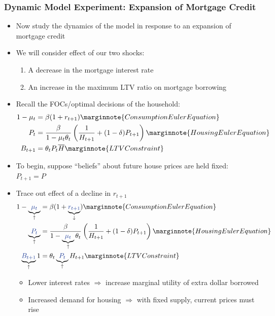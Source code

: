 \documentclass[a4paper]{article}
\begin{document}
\subsubsection{Dynamic Model Experiment: Expansion of Mortgage Credit}
	\begin{itemize}
		\item Now study the \textcolor{myblue}{dynamics} of the model in response to an expansion of mortgage credit
		\item We will consider effect of our two shocks:
		\begin{enumerate}[label=\textbf{\arabic*.}]
			\item A decrease in the mortgage interest rate
			\item An increase in the maximum LTV ratio on mortgage borrowing
		\end{enumerate}
		\item Recall the FOCs/optimal decisions of the household:
		\begin{align*}
			1-\mu_t&=\beta(1+r_{t+1}) \marginnote{Consumption Euler Equation}\\
			P_t&=\frac{\beta}{1-\mu_t\theta_t}\left( \frac{1}{H_{t+1}} + (1-\delta)P_{t+1} \right) \marginnote{Housing Euler Equation}\\
			B_{t+1}&=\theta_tP_t\overline{H} \marginnote{LTV Constraint}
		\end{align*}
		\item To begin, suppose ``beliefs'' about future house prices are held fixed: \( P_{t+1} = P \)
		\item Trace out effect of a decline in \textcolor{myblue}{\( r_{t+1} \)}
		\begin{align*}
			1-\underbrace{\textcolor{myblue}{\mu_t}}_\uparrow&=\beta(1+\underbrace{\textcolor{myblue}{r_{t+1}}}_\downarrow) \marginnote{Consumption Euler Equation}\\
			\underbrace{\textcolor{myblue}{P_t}}_\uparrow&=\frac{\beta}{1-\underbrace{\textcolor{myblue}{\mu_t}}_\uparrow\theta_t}\left( \frac{1}{H_{t+1}} + (1-\delta)P_{t+1} \right) \marginnote{Housing Euler Equation}\\
			\underbrace{\textcolor{myblue}{B_{t+1}}}_\uparrow1&=\theta_t\underbrace{\textcolor{myblue}{P_t}}_\uparrow H_{t+1} \marginnote{LTV Constraint}
		\end{align*}
		\begin{itemize}
			\item Lower interest rates \( \Rightarrow \) increase marginal utility of extra dollar borrowed
			\item Increased demand for housing \( \Rightarrow \) with fixed supply, current prices must rise

\end{itemize}
\end{itemize}
\end{document}
